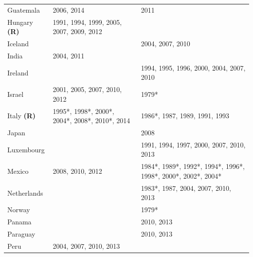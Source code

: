 \begin{tabularx}{\textwidth}{lXX}
Guatemala          & 2006, 2014                                     & 2011                                                          \\
Hungary \textbf{(R)}        & 1991, 1994, 1999, 2005, 2007, 2009, 2012       &                                                               \\
Iceland            &                                                & 2004, 2007, 2010                                              \\
India              & 2004, 2011                                     &                                                               \\
Ireland            &                                                & 1994, 1995, 1996, 2000, 2004, 2007, 2010                      \\
Israel             & 2001, 2005, 2007, 2010, 2012                   & 1979*                                                         \\
Italy \textbf{(R)}          & 1995*, 1998*, 2000*, 2004*, 2008*, 2010*, 2014 & 1986*, 1987, 1989, 1991, 1993                                 \\
Japan              &                                                & 2008                                                          \\
Luxembourg         &                                                & 1991, 1994, 1997, 2000, 2007, 2010, 2013                      \\
Mexico             & 2008, 2010, 2012                               & 1984*, 1989*, 1992*, 1994*, 1996*, 1998*, 2000*, 2002*, 2004* \\
Netherlands        &                                                & 1983*, 1987, 2004, 2007, 2010, 2013                           \\
Norway             &                                                & 1979*                                                         \\
Panama             &                                                & 2010, 2013                                                    \\
Paraguay           &                                                & 2010, 2013                                                    \\
Peru               & 2004, 2007, 2010, 2013                         &                                                               \\

\end{tabularx}
